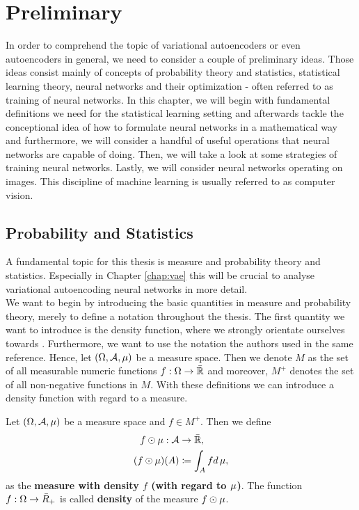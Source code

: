 \chapter{Preliminary}\label{chap:preliminary}
In order to comprehend the topic of variational autoencoders or even autoencoders in general, we need to consider a couple of preliminary ideas. Those ideas consist mainly of concepts of probability theory and statistics, statistical learning theory, neural networks and their optimization - often referred to as training of neural networks. In this chapter, we will begin with fundamental definitions we need for the statistical learning setting and afterwards tackle the conceptional idea of how to formulate neural networks in a mathematical way and furthermore, we will consider a handful of useful operations that neural networks are capable of doing. Then, we will take a look at some strategies of training neural networks. Lastly, we will consider neural networks operating on images. This discipline of machine learning is usually referred to as computer vision.


\section{Probability and Statistics}\label{sec:preliminary_prob}

A fundamental topic for this thesis is measure and probability theory and statistics. Especially in Chapter \ref{chap:vae} this will be crucial to analyse variational autoencoding neural networks in more detail.\\
We want to begin by introducing the basic quantities in measure and probability theory, merely to define a notation throughout the thesis. The first quantity we want to introduce is the density function, where we strongly orientate ourselves towards \cite[Chapter~2\& Chapter~3]{meintrup2006stochastik}. Furthermore, we want to use the notation the authors used in the same reference. Hence, let $(\Omega, \operatorname{\mathcal{A}}, \operatorname{\mu})$ be a measure space. Then we denote $M$ as the set of all measurable numeric functions $f:\Omega\to \bar{\operatorname{\mathbb{R}}}$ and moreover, $M^{+}$ denotes the set of all non-negative functions in $M$. With these definitions we can introduce a density function with regard to a measure.

\begin{definition}\label{def:density}
Let $(\Omega, \operatorname{\mathcal{A}}, \operatorname{\mu})$ be a measure space and $f\in M^{+}$. Then we define
\begin{align*}
f \odot \mu: \operatorname{\mathcal{A}} &\to \bar{\operatorname{\mathbb{R}}},\\
(f \odot \mu) (A) &\coloneqq \int_{A}fd\operatorname{\mu},
\end{align*}
as the \textbf{measure with density $f$ (with regard to $\operatorname{\mu}$)}. The function $f:\Omega \to \bar{R}_{+}$ is called \textbf{density} of the measure $f\odot \operatorname{\mu}$.
\end{definition}

